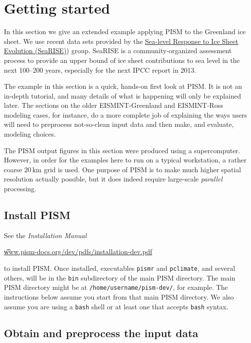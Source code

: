 
\section{Getting started}\label{sect:start}

In this section we give an extended example applying PISM to the Greenland ice sheet.  We use recent data sets provided by the \href{http://websrv.cs.umt.edu/isis/index.php/SeaRISE_Assessment}{Sea-level Response to Ice Sheet Evolution (SeaRISE)}) group.  SeaRISE is a community-organized assessment process to provide an upper bound of ice sheet contributions to sea level in the next 100--200 years, especially for the next IPCC report in 2013.

The example in this section is a quick, hands-on first look at PISM.  It is not an in-depth tutorial, and many details of what is happening will only be explained later.  The sections on the older EISMINT-Greenland and EISMINT-Ross modeling cases, for instance, do a more complete job of explaining the ways users will need to preprocess not-so-clean input data and then make, and evaluate, modeling choices.

The PISM output figures in this section were produced using a supercomputer.  However, in order for the examples here to run on a typical workstation, a rather coarse $20\,\textrm{km}$ grid is used.  One purpose of PISM is to make much higher spatial resolution actually possible, but it does indeed require large-scale \emph{parallel} processing.


\subsection{Install PISM}

See the \emph{Installation Manual}
   \begin{center}
     \href{http://www.pism-docs.org/dev/pdfs/installation-dev.pdf}{\t{www.pism-docs.org/dev/pdfs/installation-dev.pdf}}
   \end{center}
to install PISM.  Once installed, executables \texttt{pismr} and \texttt{pclimate}, and several others, will be in the \texttt{bin} subdirectory of the main PISM directory.  The main PISM directory might be at \texttt{/home/username/pism-dev/}, for example.  The instructions below assume you start from that main PISM directory.  We also assume you are using a \texttt{bash} shell or at least one that accepts \texttt{bash} syntax.


\subsection{Obtain and preprocess the input data}


